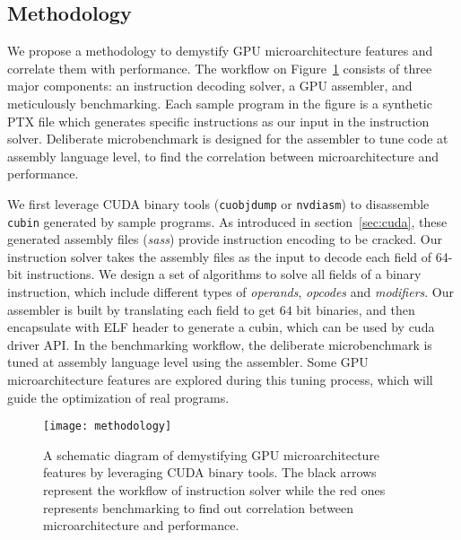 \subsection{Methodology}

We propose a methodology to demystify GPU microarchitecture features and correlate them with performance.
The workflow on Figure~\ref{fig:workflow} consists of three major components: an instruction decoding solver, a GPU assembler, and meticulously
benchmarking. %
Each sample program in the figure is a synthetic PTX file which generates specific instructions as our input in the instruction solver. %
Deliberate microbenchmark is designed for the assembler to tune code at assembly language level, to find the correlation
between microarchitecture and performance.

We first leverage CUDA binary tools ({\tt cuobjdump} or {\tt nvdiasm}) to disassemble {\tt cubin} generated by sample programs. %
As introduced in section~\ref{sec:cuda}, these generated assembly files ({\em sass}) provide instruction encoding to be cracked.
Our instruction solver takes the assembly files as the input to decode each field of 64-bit instructions.
We design a set of algorithms to solve all fields of a binary instruction, which include different types of {\em operands}, {\em opcodes} and {\em modifiers}.
Our assembler is built by translating each field to get $64$ bit binaries, and then encapsulate with ELF header to
generate a cubin, which can be used by cuda driver API.
In the benchmarking workflow, the deliberate microbenchmark is tuned at assembly language level using the assembler.
Some GPU microarchitecture features are explored during this tuning process, which will guide the optimization of real programs.


\begin{figure}[htbp]
\begin{center}
\texttt{[image: methodology]}
\caption{A schematic diagram of demystifying GPU microarchitecture features by leveraging CUDA binary tools. The black arrows
represent the workflow of instruction solver while the red ones represents benchmarking to find out correlation between microarchitecture
    and performance.}%
\label{fig:workflow}
\end{center}
\end{figure}
